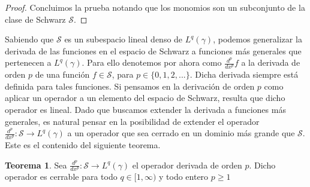 \documentclass[letterpaper,twoside,12pt]{book}
\renewcommand{\S}{\mathcal{S}}
\newcommand{\1}{\mathds{1}}
\renewcommand{\to}{\rightarrow}
\theoremstyle{definition}
\theoremstyle{definition}
\newtheorem{teo}{Teorema}
\theoremstyle{remark}
\theoremstyle{definition}
\theoremstyle{definition}
\theoremstyle{definition}
\theoremstyle{definition}
\theoremstyle{definition}
\begin{document}
\begin{proof}
   Concluimos la prueba notando que los monomios son un subconjunto de la clase de Schwarz $\S$.
 \end{proof}
Sabiendo que $\mathcal{S}$ es un subespacio lineal denso de $L^{q}(\gamma)$, podemos generalizar la derivada de las funciones en el espacio de Schwarz a funciones más generales que pertenecen a $L^{q}(\gamma)$. Para ello denotemos por ahora como $\frac{d^p}{dx^p}f$ a la derivada de orden $p$ de una función $f\in \S$, para $p\in \{0,1,2,...\}$. Dicha derivada siempre está definida para tales funciones. Si pensamos en la derivación de orden $p$ como aplicar un operador a un elemento del espacio de Schwarz, resulta que dicho operador es lineal. Dado que buscamos extender la derivada a funciones más generales, es natural pensar en la posibilidad de extender el operador $\frac{d^p}{dx^{p}}:\S\to L^{q}(\gamma)$ a un operador que sea cerrado en un dominio más grande que $\S$. Este es el contenido del siguiente teorema.
\begin{teo} 
Sea $\frac{d^{p}}{dx^p}:\mathcal{S}\longrightarrow L^{q}(\gamma)$ el operador derivada de orden $p$. Dicho operador es cerrable para todo $q\in [1,\infty)$ y todo entero $p\geq1$
\end{teo}
\end{document}

